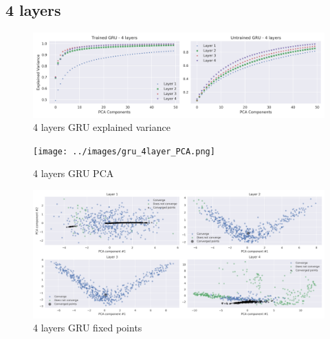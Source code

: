 \documentclass{article}
\begin{document}
\subsection{4 layers}
\label{anx:4-layers}
\begin{figure}[H]
  \centering
  \includegraphics[width=\textwidth]{../images/gru_4layer_explained_variance.png}
  \caption{4 layers GRU explained variance}
  \label{fig:-images-gru_4layer_explained_variance-png}
\end{figure}
\begin{figure}[H]
  \centering
  \texttt{[image: ../images/gru\_4layer\_PCA.png]}
  \caption{4 layers GRU PCA}
  \label{fig:-images-gru_4layer_PCA-png}
\end{figure}
\begin{figure}[H]
  \centering
  \includegraphics[width=\textwidth]{../images/gru_4layer_fixed_points.png}
  \caption{4 layers GRU fixed points}
  \label{fig:-images-gru_4layer_fixed_points-png}
\end{figure}
\end{document}

